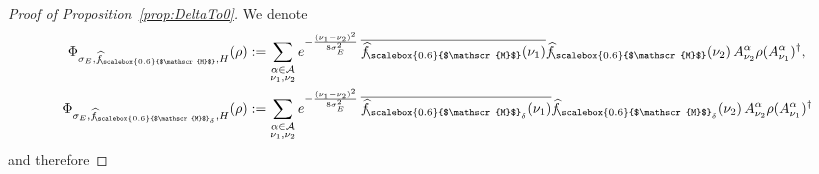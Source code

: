 \documentclass[11pt]{amsart}
\newcommand{\1}{\mathbbm{1}}
\newcommand{\hatfM}{\widehat{f}_{\!\scalebox{0.6}{$\mathscr{M}$}}
}
\newcommand{\hatfMdelta}{\widehat{f}_{\!\scalebox{0.6}{$\mathscr{M}$}_\delta}}
\theoremstyle{plain}
\theoremstyle{definition}
\theoremstyle{remark}
\numberwithin{equation}{section}
\begin{document}
\begin{proof}[Proof of Proposition~\ref{prop:DeltaTo0}]


We denote
\begin{align*}
    \Phi_{\sigma_E,\hatfM,H}(\rho)&:=\sum_{\substack{\alpha\in\mathcal{A}\\ \nu_1,\nu_2}}e^{-\frac{(\nu_1-\nu_2)^2}{8\sigma_E^2}}\, \overline{\hatfM(\nu_1)}\hatfM(\nu_2)\, A^\alpha_{\nu_2} \rho (A^\alpha_{\nu_1})^\dagger,\\   \Phi_{\sigma_E,\hatfMdelta,H}(\rho)&:=\sum_{\substack{\alpha\in\mathcal{A}\\ \nu_1,\nu_2}}e^{-\frac{(\nu_1-\nu_2)^2}{8\sigma_E^2}}\, \overline{\hatfMdelta(\nu_1)}\hatfMdelta(\nu_2)\, A^\alpha_{\nu_2} \rho (A^\alpha_{\nu_1})^\dagger 
\end{align*}
and therefore


\end{proof}
\end{document}

